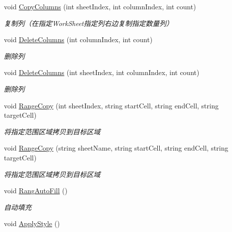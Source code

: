 \begin{DoxyCompactItemize}
void \hyperlink{class_x_c_l_net_tools_1_1_data_handler_1_1_excel_helper_a4747b28517aaa00ebd20abfceb7a8161}{Copy\-Columns} (int sheet\-Index, int column\-Index, int count)
\begin{DoxyCompactList}\small\item\em 复制列（在指定\-Work\-Sheet指定列右边复制指定数量列） \end{DoxyCompactList}\item 
void \hyperlink{class_x_c_l_net_tools_1_1_data_handler_1_1_excel_helper_a07bf346a96fdd9723478313b7bca25e0}{Delete\-Columns} (int column\-Index, int count)
\begin{DoxyCompactList}\small\item\em 删除列 \end{DoxyCompactList}\item 
void \hyperlink{class_x_c_l_net_tools_1_1_data_handler_1_1_excel_helper_a905fec84987bc88a0b28e70f954ca0ea}{Delete\-Columns} (int sheet\-Index, int column\-Index, int count)
\begin{DoxyCompactList}\small\item\em 删除列 \end{DoxyCompactList}\item 
void \hyperlink{class_x_c_l_net_tools_1_1_data_handler_1_1_excel_helper_a383ca6f7c7ad61c7c042ce533153ec87}{Range\-Copy} (int sheet\-Index, string start\-Cell, string end\-Cell, string target\-Cell)
\begin{DoxyCompactList}\small\item\em 将指定范围区域拷贝到目标区域 \end{DoxyCompactList}\item 
void \hyperlink{class_x_c_l_net_tools_1_1_data_handler_1_1_excel_helper_ac81856c1c2e61c5674448c5588d6f88b}{Range\-Copy} (string sheet\-Name, string start\-Cell, string end\-Cell, string target\-Cell)
\begin{DoxyCompactList}\small\item\em 将指定范围区域拷贝到目标区域 \end{DoxyCompactList}\item 
void \hyperlink{class_x_c_l_net_tools_1_1_data_handler_1_1_excel_helper_ab1974e3579c233eb2a8c1b1bcbbc0aea}{Rang\-Auto\-Fill} ()
\begin{DoxyCompactList}\small\item\em 自动填充 \end{DoxyCompactList}\item 
void \hyperlink{class_x_c_l_net_tools_1_1_data_handler_1_1_excel_helper_abc029180bf2199f182a4c60d3a0f585b}{Apply\-Style} ()

\end{DoxyCompactItemize}
